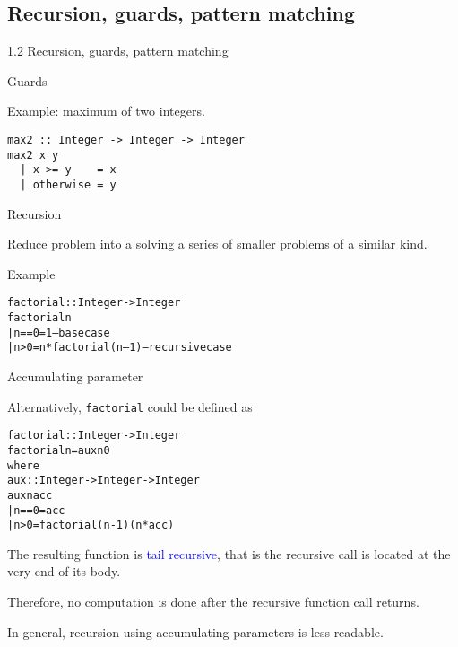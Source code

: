 \documentclass{beamer}
\def\code#1{\texttt{\frenchspacing#1}}
\begin{document}
\subsection{Recursion, guards, pattern matching}

\begin{frame}[fragile]{1.2 Recursion, guards, pattern matching}

\begin{block}{Guards}
\begin{exampleblock}{Example: maximum of two integers.}
\begin{verbatim}
max2 :: Integer -> Integer -> Integer
max2 x y
  | x >= y    = x
  | otherwise = y
\end{verbatim}
\end{exampleblock}
\end{block}

\end{frame}

\begin{frame}[fragile]{Recursion}

\begin{block}{\centering Reduce problem into a solving a series of smaller problems of a similar kind.}
\end{block}

\begin{exampleblock}{Example}
\begin{alltt}
factorial :: Integer -> Integer
factorial n\pause
  | n == 0 = 1                       -- base case
  | n > 0  = n * factorial (n – 1)   -- recursive case
\end{alltt}
\end{exampleblock}

\end{frame}

\begin{frame}[fragile]{Accumulating parameter}

Alternatively, \code{factorial} could be defined as

\begin{alltt}
factorial :: Integer -> Integer\pause
factorial n = aux n 0
  where
    aux :: Integer -> Integer -> Integer
    aux n acc\pause
      | n == 0 = acc
      | n > 0  = factorial (n - 1) (n * acc)
\end{alltt}

\pause

The resulting function is \textcolor{blue}{tail recursive}, that is the recursive call is located at the very end of its body. \par
Therefore, no computation is done after the recursive function call returns.

\pause

\vspace{1cm}
In general, recursion using accumulating parameters is less readable.

\end{frame}
\end{document}
